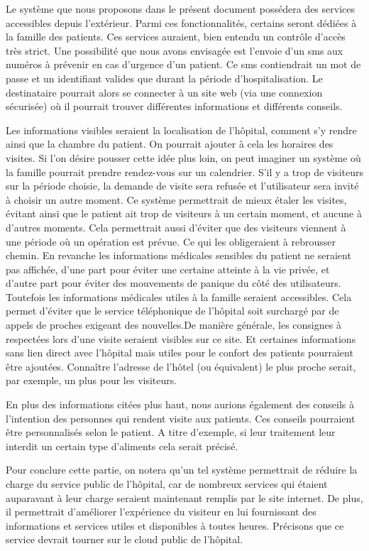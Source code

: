 Le système que nous proposons dans le présent document possédera des services accessibles depuis l'extérieur. Parmi ces
fonctionnalités, certains seront dédiées à la famille des patients. Ces services auraient, bien entendu un contrôle d'accès très
strict. Une possibilité que nous avons envisagée est l'envoie d'un sms aux numéros à prévenir en cas d'urgence d'un patient. Ce
sms contiendrait un mot de passe et un identifiant valides que durant la période d'hospitalisation. Le destinataire pourrait alors
se connecter à un site web (via une connexion sécurisée) où il pourrait trouver différentes informations et différents conseils.
\newline

Les informations visibles seraient la localisation de l'hôpital, comment s'y rendre ainsi que la chambre du patient. On pourrait
ajouter à cela les horaires des visites. Si l'on désire pousser cette idée plus loin, on peut imaginer un système où la famille
pourrait prendre rendez-vous sur un calendrier. S'il y a trop de visiteurs sur la période choisie, la demande de visite sera
refusée et l'utilisateur sera invité à choisir un autre moment. Ce système permettrait de mieux étaler les visites, évitant ainsi
que le patient ait trop de visiteurs à un certain moment, et aucune à d'autres moments. Cela permettrait aussi d'éviter que des
visiteurs viennent à une période où un opération est prévue. Ce qui les obligeraient à rebrousser chemin. En revanche les
informations médicales sensibles du patient ne seraient pas affichée, d'une part pour éviter une certaine atteinte à la vie
privée, et d'autre part pour éviter des mouvements de panique du côté des utilisateurs. Toutefois les informations médicales
utiles à la famille seraient accessibles. Cela permet d'éviter que le service téléphonique de l'hôpital soit  surchargé par de
appels de proches exigeant des nouvelles.De manière générale, les consignes à respectées lors d'une visite seraient visibles sur
ce site. Et certaines informations sans lien direct avec l'hôpital mais utiles pour le confort des patients pourraient être
ajoutées. Connaître l'adresse de l'hôtel (ou équivalent) le plus proche serait, par exemple, un plus pour les visiteurs.
\newline

En plus des informations citées plus haut, nous aurions également des conseils à l'intention des personnes qui rendent visite aux
patients. Ces conseils pourraient être personnalisés selon le patient. A titre d'exemple, si leur traitement leur interdit un certain type d'aliments
cela serait précisé. 
\newline

Pour conclure cette partie, on notera qu'un tel système permettrait de réduire la charge du service public de l'hôpital, car de
nombreux services qui étaient auparavant à leur charge seraient maintenant remplis par le site internet. De plus, il permettrait
d'améliorer l'expérience du visiteur en lui fournissant des informations et services utiles et disponibles à toutes heures.
Précisons que ce service devrait tourner sur le cloud public de l'hôpital.
